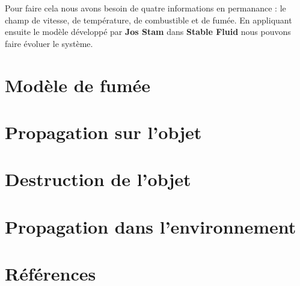 \documentclass[a4paper,10pt]{article}
\begin{document}
Pour faire cela nous avons besoin de quatre informations en permanance
: le champ de vitesse, de température, de combustible et de fumée. En
appliquant ensuite le modèle développé par \textbf{Jos Stam} dans
\textbf{Stable Fluid} nous pouvons faire évoluer le système.\\


\section{Modèle de fumée}





\section{Propagation sur l'objet}





\section{Destruction de l'objet}





\section{Propagation dans l'environnement}


\section{Références}


\end{document}
